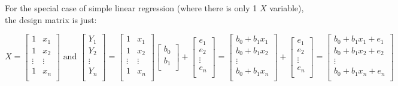\documentclass[a4paper, 11pt, twoside]{article}
\begin{document}
For the special case of simple linear regression (where there is only 1 $X$ variable), the design matrix is just:

\[
X=
\begin{bmatrix}
	1 & x_1\\
	1 & x_2\\
	\vdots & \vdots\\
	1 & x_n\\
\end{bmatrix}
\text{ and }
\begin{bmatrix}
	Y_1\\Y_2\\\vdots\\Y_n\\
\end{bmatrix}
=
\begin{bmatrix}
	1 & x_1\\
	1 & x_2\\
	\vdots & \vdots\\
	1 & x_n\\
\end{bmatrix}
\begin{bmatrix}
	b_0\\b_1\\
\end{bmatrix}
+
\begin{bmatrix}
	e_1\\e_2\\\vdots\\e_n\\
\end{bmatrix}
=
\begin{bmatrix}
	b_0+b_1x_1\\
	b_0+b_1x_2\\
	\vdots\\
	b_0+b_1x_n\\
\end{bmatrix}
+
\begin{bmatrix}
	e_1\\e_2\\\vdots\\e_n\\
\end{bmatrix}
=
\begin{bmatrix}
	b_0+b_1x_1+e_1\\
	b_0+b_1x_2+e_2\\
	\vdots\\
	b_0+b_1x_n+e_n\\
\end{bmatrix}
\]
\end{document}
